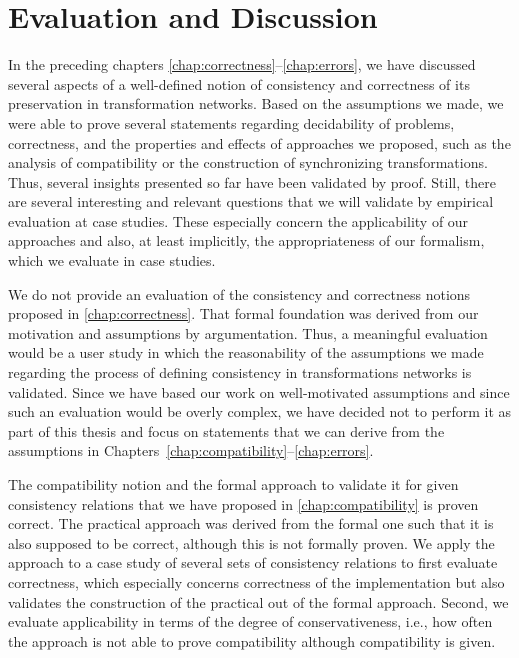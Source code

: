 \chapter{Evaluation and Discussion 
}
\label{chap:correctness_evaluation}

In the preceding chapters \ref{chap:correctness}--\ref{chap:errors}, we have discussed several aspects of a well-defined notion of consistency and correctness of its preservation in transformation networks.
Based on the assumptions we made, we were able to prove several statements regarding decidability of problems, correctness, and the properties and effects of approaches we proposed, such as the analysis of compatibility or the construction of synchronizing transformations.
Thus, several insights presented so far have been validated by proof.
Still, there are several interesting and relevant questions that we will validate by empirical evaluation at case studies.
These especially concern the applicability of our approaches and also, at least implicitly, the appropriateness of our formalism, which we evaluate in case studies.

We do not provide an evaluation of the consistency and correctness notions proposed in \autoref{chap:correctness}.
That formal foundation was derived from our motivation and assumptions by argumentation.
Thus, a meaningful evaluation would be a user study in which the reasonability of the assumptions we made regarding the process of defining consistency in transformations networks is validated.
Since we have based our work on well-motivated assumptions and since such an evaluation would be overly complex, we have decided not to perform it as part of this thesis and focus on statements that we can derive from the assumptions in Chapters~\ref{chap:compatibility}--\ref{chap:errors}.

The compatibility notion and the formal approach to validate it for given consistency relations that we have proposed in \autoref{chap:compatibility} is proven correct.
The practical approach was derived from the formal one such that it is also supposed to be correct, although this is not formally proven.
We apply the approach to a case study of several sets of consistency relations to first evaluate correctness, which especially concerns correctness of the implementation but also validates the construction of the practical out of the formal approach.
Second, we evaluate applicability in terms of the degree of conservativeness, i.e., how often the approach is not able to prove compatibility although compatibility is given.

